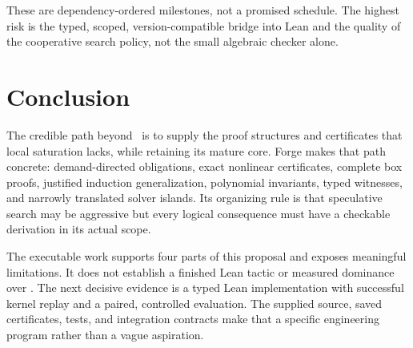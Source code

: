 These are dependency-ordered milestones, not a promised schedule. The highest
risk is the typed, scoped, version-compatible bridge into Lean and the quality
of the cooperative search policy, not the small algebraic checker alone.

\section{Conclusion}

The credible path beyond \grind\ is to supply the proof structures and
certificates that local saturation lacks, while retaining its mature core.
Forge makes that path concrete: demand-directed obligations, exact nonlinear
certificates, complete box proofs, justified induction generalization,
polynomial invariants, typed witnesses, and narrowly translated solver islands.
Its organizing rule is that speculative search may be aggressive but every
logical consequence must have a checkable derivation in its actual scope.

The executable work supports four parts of this proposal and exposes meaningful
limitations. It does not establish a finished Lean tactic or measured dominance
over \grind. The next decisive evidence is a typed Lean implementation with
successful kernel replay and a paired, controlled evaluation. The supplied
source, saved certificates, tests, and integration contracts make that a
specific engineering program rather than a vague aspiration.

